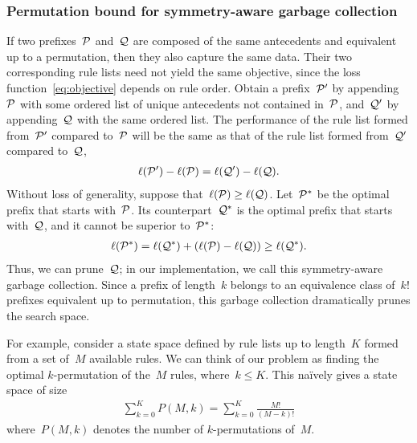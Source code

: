 \subsubsection{Permutation bound for symmetry-aware garbage collection}

If two prefixes~$\cal{P}$ and~$\cal{Q}$ are composed of the same antecedents and
equivalent up to a permutation, then they also capture the same data.
%
Their two corresponding rule lists need not yield the same objective, since the
loss function~\eqref{eq:objective} depends on rule order.
%
Obtain a prefix~$\cal{P}'$ by appending~$\cal{P}$ with some ordered list of
unique antecedents not contained in~$\cal{P}$, and~$\cal{Q}'$ by appending~$\cal{Q}$
with the same ordered list.
%
The performance of the rule list formed from~$\cal{P}'$ compared to~$\cal{P}$ will be
the same as that of the rule list formed from~$\cal{Q}'$ compared to~$\cal{Q}$, \ie
\begin{align}
\ell(\cal{P}') - \ell(\cal{P}) = \ell(\cal{Q}') - \ell(\cal{Q}).
\end{align}
Without loss of generality, suppose that~${\ell(\cal{P}) \ge \ell(\cal{Q})}$.
%
Let~$\cal{P}^*$ be the optimal prefix that starts with~$\cal{P}$.
%
Its counterpart~$\cal{Q}^*$ is the optimal prefix that starts with~$\cal{Q}$,
and it cannot be superior to~$\cal{P^*}$:
%
\begin{align}
\ell(\cal{P}^*) = \ell(\cal{Q^*}) + (\ell(\cal{P}) - \ell(\cal{Q})) \ge \ell(\cal{Q^*}).
\end{align}
%
Thus, we can prune~$\cal{Q}$;
in our implementation, we call this symmetry-aware garbage collection.
%
Since a prefix of length~$k$ belongs to an equivalence class of~$k!$ prefixes
equivalent up to permutation, this garbage collection dramatically prunes the search space.

For example, consider a state space defined by rule lists up to length~$K$
formed from a set of~$M$ available rules.
%
We can think of our problem as finding the optimal $k$-permutation of the~$M$ rules,
where~${k \le K}$.
%
This na\"ively gives a state space of size
\begin{align}
\sum_{k=0}^K P(M, k) = \sum_{k=0}^K \frac{M!}{(M - k)!}
\end{align}
where~${P(M, k)}$ denotes the number of $k$-permutations of~$M$.

